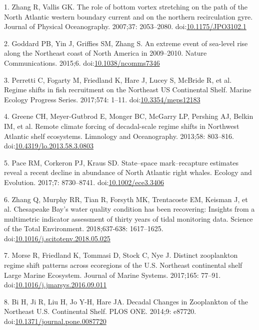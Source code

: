\documentclass[10pt,]{article}
\begin{document}
\hypertarget{refs}{}
\hypertarget{ref-zhang_role_2007}{}
1. Zhang R, Vallis GK. The role of bottom vortex stretching on the path
of the North Atlantic western boundary current and on the northern
recirculation gyre. Journal of Physical Oceanography. 2007;37:
2053--2080.
doi:\href{https://doi.org/10.1175/JPO3102.1}{10.1175/JPO3102.1}

\hypertarget{ref-goddard_extreme_2015}{}
2. Goddard PB, Yin J, Griffies SM, Zhang S. An extreme event of
sea-level rise along the Northeast coast of North America in 2009--2010.
Nature Communications. 2015;6.
doi:\href{https://doi.org/10.1038/ncomms7346}{10.1038/ncomms7346}

\hypertarget{ref-perretti_regime_2017}{}
3. Perretti C, Fogarty M, Friedland K, Hare J, Lucey S, McBride R, et
al. Regime shifts in fish recruitment on the Northeast US Continental
Shelf. Marine Ecology Progress Series. 2017;574: 1--11.
doi:\href{https://doi.org/10.3354/meps12183}{10.3354/meps12183}

\hypertarget{ref-greene_remote_2013}{}
4. Greene CH, Meyer-Gutbrod E, Monger BC, McGarry LP, Pershing AJ,
Belkin IM, et al. Remote climate forcing of decadal-scale regime shifts
in Northwest Atlantic shelf ecosystems. Limnology and Oceanography.
2013;58: 803--816.
doi:\href{https://doi.org/10.4319/lo.2013.58.3.0803}{10.4319/lo.2013.58.3.0803}

\hypertarget{ref-pace_statespace_2017}{}
5. Pace RM, Corkeron PJ, Kraus SD. State--space mark--recapture
estimates reveal a recent decline in abundance of North Atlantic right
whales. Ecology and Evolution. 2017;7: 8730--8741.
doi:\href{https://doi.org/10.1002/ece3.3406}{10.1002/ece3.3406}

\hypertarget{ref-zhang_chesapeake_2018}{}
6. Zhang Q, Murphy RR, Tian R, Forsyth MK, Trentacoste EM, Keisman J, et
al. Chesapeake Bay's water quality condition has been recovering:
Insights from a multimetric indicator assessment of thirty years of
tidal monitoring data. Science of the Total Environment. 2018;637-638:
1617--1625.
doi:\href{https://doi.org/10.1016/j.scitotenv.2018.05.025}{10.1016/j.scitotenv.2018.05.025}

\hypertarget{ref-morse_distinct_2017}{}
7. Morse R, Friedland K, Tommasi D, Stock C, Nye J. Distinct zooplankton
regime shift patterns across ecoregions of the U.S. Northeast
continental shelf Large Marine Ecosystem. Journal of Marine Systems.
2017;165: 77--91.
doi:\href{https://doi.org/10.1016/j.jmarsys.2016.09.011}{10.1016/j.jmarsys.2016.09.011}

\hypertarget{ref-bi_decadal_2014}{}
8. Bi H, Ji R, Liu H, Jo Y-H, Hare JA. Decadal Changes in Zooplankton of
the Northeast U.S. Continental Shelf. PLOS ONE. 2014;9: e87720.
doi:\href{https://doi.org/10.1371/journal.pone.0087720}{10.1371/journal.pone.0087720}
\end{document}
